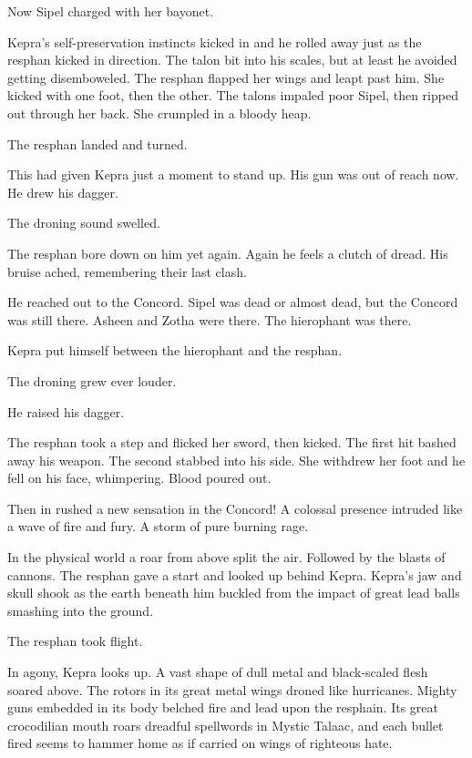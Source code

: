 \documentclass
  [a4paper,
   12pt,
   oneside
  ]%
  {article}
\begin{document}
Now Sipel charged with her bayonet. 

Kepra's self-preservation instincts kicked in and he rolled away just as the resphan kicked in direction. 
The talon bit into his scales, but at least he avoided getting disemboweled.
The resphan flapped her wings and leapt past him. 
She kicked with one foot, then the other.
The talons impaled poor Sipel, then ripped out through her back. 
She crumpled in a bloody heap.

The resphan landed and turned. 

This had given Kepra just a moment to stand up. His gun was out of reach now. He drew his dagger. 

The droning sound swelled.

The resphan bore down on him yet again.
Again he feels a clutch of dread. His bruise ached, remembering their last clash. 

He reached out to the Concord. Sipel was dead or almost dead, but the Concord was still there. 
Asheen and Zotha were there. The hierophant was there. 

Kepra put himself between the hierophant and the resphan.

The droning grew ever louder.

He raised his dagger. 

The resphan took a step and flicked her sword, then kicked. The first hit bashed away his weapon. The second stabbed into his side. 
She withdrew her foot and he fell on his face, whimpering. 
Blood poured out.

Then in rushed a new sensation in the Concord! 
A colossal presence intruded like a wave of fire and fury. 
A storm of pure burning rage.

In the physical world a roar from above split the air. 
Followed by the blasts of cannons. 
The resphan gave a start and looked up behind Kepra. 
Kepra's jaw and skull shook as the earth beneath him buckled from the impact of great lead balls smashing into the ground. 

The resphan took flight. 

In agony, Kepra looks up. 
A vast shape of dull metal and black-scaled flesh soared above. 
The rotors in its great metal wings droned like hurricanes. 
Mighty guns embedded in its body belched fire and lead upon the resphain. 
Its great crocodilian mouth roars dreadful spellwords in Mystic Talaac, and each bullet fired seems to hammer home as if carried on wings of righteous hate. 
\end{document}
